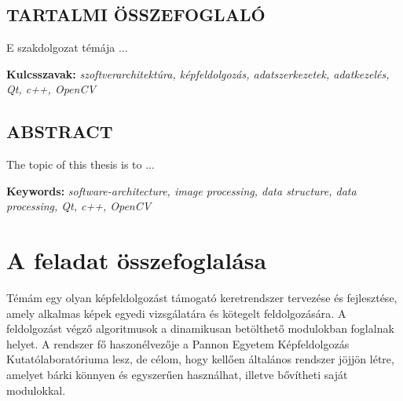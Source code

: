 \documentclass[a4paper,12pt,oneside]{report}
\begin{document}
\begin{center}
\section*{\textbf{\Large \MakeUppercase{Tartalmi összefoglaló}}}
\end{center}

E szakdolgozat témája ...

\vspace{2cm}

{\bf Kulcsszavak:} {\it szoftverarchitektúra, képfeldolgozás, adatszerkezetek, adatkezelés, Qt, c++, OpenCV}
\newpage

\newpage

\begin{center}
\section*{\textbf{\Large \MakeUppercase{Abstract}}}
\end{center}

The topic of this thesis is to ...

\vspace{2cm}

{\bf Keywords:} {\it software-architecture, image processing, data structure, data processing, Qt, c++, OpenCV}
\newpage
\listoftodos

\renewcommand{\thefigure}{\arabic{figure}}

\setcounter{tocdepth}{3} %
\thispagestyle{empty}
\tableofcontents
\pagebreak

\setcounter{page}{1} %
\pagestyle{plain}
\fancyhead[C]{\rightmark}
\fancyfoot[R]{\thepage}

\section{A feladat összefoglalása}

Témám egy olyan képfeldolgozást támogató keretrendszer tervezése és fejlesztése, amely alkalmas képek egyedi vizsgálatára és kötegelt feldolgozására. A feldolgozást végző algoritmusok a dinamikusan betölthető modulokban foglalnak helyet. A rendszer fő haszonélvezője a Pannon Egyetem Képfeldolgozás Kutatólaboratóriuma lesz, de célom, hogy kellően általános rendszer jöjjön létre, amelyet bárki könnyen és egyszerűen használhat, illetve bővítheti saját modulokkal.
\end{document}
